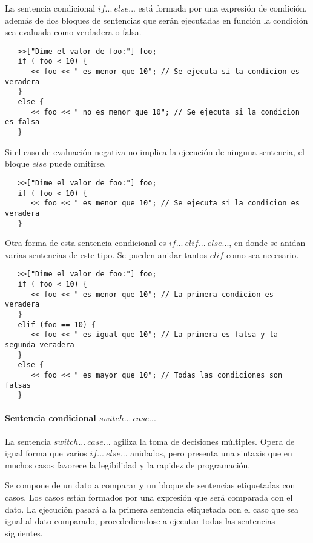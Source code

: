 La sentencia condicional $if...\ else...$ está formada por una expresión de condición, además de dos bloques de sentencias que serán ejecutadas en función la condición sea evaluada 
como verdadera o falsa. \\

\begin{lstlisting}
   >>["Dime el valor de foo:"] foo;
   if ( foo < 10) { 
      << foo << " es menor que 10"; // Se ejecuta si la condicion es veradera
   }
   else {
      << foo << " no es menor que 10"; // Se ejecuta si la condicion es falsa
   }
\end{lstlisting}

Si el caso de evaluación negativa no implica la ejecución de ninguna sentencia, el bloque $else$ puede omitirse. \\

\begin{lstlisting}
   >>["Dime el valor de foo:"] foo;
   if ( foo < 10) { 
      << foo << " es menor que 10"; // Se ejecuta si la condicion es veradera
   }
\end{lstlisting}

Otra forma de esta sentencia condicional es $if...\ elif...\ else...$, en donde se anidan varias
sentencias de este tipo. Se pueden anidar tantos $elif$ como sea necesario.\\

\begin{lstlisting}
   >>["Dime el valor de foo:"] foo;
   if ( foo < 10) { 
      << foo << " es menor que 10"; // La primera condicion es veradera
   }
   elif (foo == 10) {
      << foo << " es igual que 10"; // La primera es falsa y la segunda veradera
   }
   else {
      << foo << " es mayor que 10"; // Todas las condiciones son falsas
   }
\end{lstlisting}

\paragraph{Sentencia condicional $switch...\ case...$}
La sentencia $switch...\ case...$ agiliza la toma de decisiones múltiples. Opera de igual forma que varios 
$if...\ else...$ anidados, pero presenta una sintaxis que en muchos casos favorece la legibilidad y 
la rapidez de programación.

Se compone de un dato a comparar y un bloque de sentencias etiquetadas con casos. Los casos están formados por una expresión que 
será comparada con el dato. La ejecución pasará a la primera sentencia etiquetada
con el caso que sea igual al dato comparado, procedediendose a ejecutar todas las sentencias siguientes. \\

